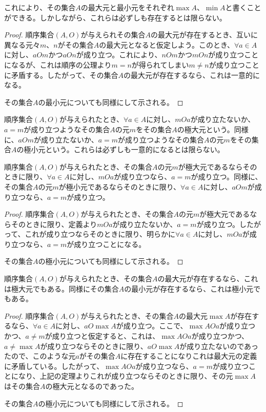 \documentclass[dvipdfmx]{jsarticle}
\begin{document}
これにより、その集合$A$の最大元と最小元をそれぞれ$\max A$、$\min A$と書くことができる。しかしながら、これらは必ずしも存在するとは限らない。
\begin{proof}
順序集合$(A,O)$が与えられその集合$A$の最大元が存在するとき、互いに異なる元々$m$、$n$がその集合$A$の最大元となると仮定しよう。このとき、$\forall a \in A$に対し、$aOm$かつ$aOn$が成り立つ。これにより、$nOm$かつ$mOn$が成り立つことになるが、これは順序の公理より$m = n$が得られてしまい$m \neq n$が成り立つことに矛盾する。したがって、その集合$A$の最大元が存在するなら、これは一意的になる。\par
その集合$A$の最小元についても同様にして示される。
\end{proof}
\begin{dfn}
順序集合$(A,O)$が与えられたとき、$\forall a \in A$に対し、$mOa$が成り立たないか、$a = m$が成り立つようなその集合$A$の元$m$をその集合$A$の極大元という。同様に、$aOm$が成り立たないか、$a = m$が成り立つようなその集合$A$の元$m$をその集合$A$の極小元という。これらは必ずしも一意的になるとは限らない。
\end{dfn}
\begin{thm}\label{1.3.1.4}
順序集合$(A,O)$が与えられたとき、その集合$A$の元$m$が極大元であるならそのときに限り、$\forall a \in A$に対し、$mOa$が成り立つなら、$a = m$が成り立つ。同様に、その集合$A$の元$m$が極小元であるならそのときに限り、$\forall a \in A$に対し、$aOm$が成り立つなら、$a = m$が成り立つ。
\end{thm}
\begin{proof}
順序集合$(A,O)$が与えられたとき、その集合$A$の元$m$が極大元であるならそのときに限り、定義より$mOa$が成り立たないか、$a = m$が成り立つ。したがって、これが成り立つならそのときに限り、明らかに$\forall a \in A$に対し、$mOa$が成り立つなら、$a = m$が成り立つことになる。\par
その集合$A$の極小元についても同様にして示される。
\end{proof}
\begin{thm}\label{1.3.1.5}
順序集合$(A,O)$が与えられたとき、その集合$A$の最大元が存在するなら、これは極大元でもある。同様にその集合$A$の最小元が存在するなら、これは極小元でもある。
\end{thm}
\begin{proof}
順序集合$(A,O)$が与えられたとき、その集合$A$の最大元$\max A$が存在するなら、$\forall a \in A$に対し、$aO\max A$が成り立つ。ここで、$\max AOa$が成り立つかつ、$a \neq m$が成り立つと仮定すると、これは、$\max AOa$が成り立つかつ、$a \neq \max A$が成り立つならそのときに限り、$aO\max A$が成り立たないのであったので、このような元$a$がその集合$A$に存在することになりこれは最大元の定義に矛盾している。したがって、$\max AOa$が成り立つなら、$a = m$が成り立つことになり、上記の定理よりこれが成り立つならそのときに限り、その元$\max A$はその集合$A$の極大元となるのであった。\par
その集合$A$の極小元についても同様にして示される。
\end{proof}
\end{document}
